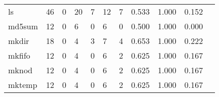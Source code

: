 \begin{longtable}{lp{1.2cm}p{1.2cm}p{1.2cm}p{1.2cm}p{1.2cm}p{1.2cm}p{1.2cm}p{1.2cm}p{1.2cm}p{1.2cm}}
ls        &                                    46 &                                                  0 &                                                 20 &                                                  7 &                                                 12 &                                                  7 &                                              0.533 &                                              1.000 &                                              0.152 \\
md5sum    &                                    12 &                                                  0 &                                                  6 &                                                  0 &                                                  6 &                                                  0 &                                              0.500 &                                              1.000 &                                              0.000 \\
mkdir     &                                    18 &                                                  0 &                                                  4 &                                                  3 &                                                  7 &                                                  4 &                                              0.653 &                                              1.000 &                                              0.222 \\
mkfifo    &                                    12 &                                                  0 &                                                  4 &                                                  0 &                                                  6 &                                                  2 &                                              0.625 &                                              1.000 &                                              0.167 \\
mknod     &                                    12 &                                                  0 &                                                  4 &                                                  0 &                                                  6 &                                                  2 &                                              0.625 &                                              1.000 &                                              0.167 \\
mktemp    &                                    12 &                                                  0 &                                                  4 &                                                  0 &                                                  6 &                                                  2 &                                              0.625 &                                              1.000 &                                              0.167 \\

\end{longtable}
